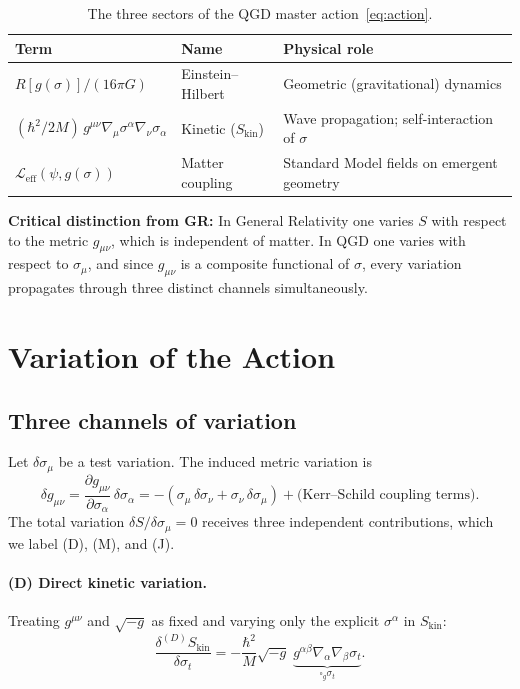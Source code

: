 \documentclass[11pt,a4paper]{article}
\theoremstyle{plain}
\theoremstyle{definition}
\theoremstyle{remark}
\newcommand{\sigt}{\sigma_t}
\newcommand{\boxg}{\square_g}
\newcommand{\Skin}{S_{\mathrm{kin}}}
\begin{document}
\begin{table}[h]
\centering
\renewcommand{\arraystretch}{1.35}
\begin{tabular}{@{}p{4.5cm}p{5cm}p{4.5cm}@{}}
\toprule
Term & Name & Physical role \\
\midrule
$R[g(\sigma)]/(16\pi G)$ & Einstein--Hilbert & Geometric (gravitational) dynamics \\
$(\hbar^2/2M)\,g^{\mu\nu}\nabla_\mu\sigma^\alpha\nabla_\nu\sigma_\alpha$ &
  Kinetic ($\Skin$) & Wave propagation; self-interaction of $\sigma$ \\
$\mathcal{L}_{\mathrm{eff}}(\psi,g(\sigma))$ & Matter coupling &
  Standard Model fields on emergent geometry \\
\bottomrule
\end{tabular}
\caption{The three sectors of the QGD master action~\eqref{eq:action}.}
\end{table}

\textbf{Critical distinction from GR:} In General Relativity one varies $S$ with respect
to the metric $g_{\mu\nu}$, which is independent of matter.  In QGD one varies with
respect to $\sigma_\mu$, and since $g_{\mu\nu}$ is a composite functional of $\sigma$,
every variation propagates through three distinct channels simultaneously.

\section{Variation of the Action}
\label{sec:variation}

\subsection{Three channels of variation}

Let $\delta\sigma_\mu$ be a test variation.  The induced metric variation is
\begin{equation}
  \delta g_{\mu\nu} = \frac{\partial g_{\mu\nu}}{\partial\sigma_\alpha}\,\delta\sigma_\alpha
  = -(\sigma_\mu\,\delta\sigma_\nu + \sigma_\nu\,\delta\sigma_\mu)
    + \text{(Kerr--Schild coupling terms)}.
  \label{eq:delta_g}
\end{equation}
The total variation $\delta S/\delta\sigma_\mu = 0$ receives three independent
contributions, which we label (D), (M), and (J).

\paragraph{(D) Direct kinetic variation.}
Treating $g^{\mu\nu}$ and $\sqrt{-g}$ as fixed and varying only the explicit $\sigma^\alpha$
in $\Skin$:
\begin{equation}
  \frac{\delta^{(D)}\Skin}{\delta\sigt} =
  -\frac{\hbar^2}{M}\sqrt{-g}\;
  \underbrace{g^{\alpha\beta}\nabla_\alpha\nabla_\beta\sigt}_{\displaystyle\boxg\sigt}.
  \label{eq:var_D}
\end{equation}
\end{document}
